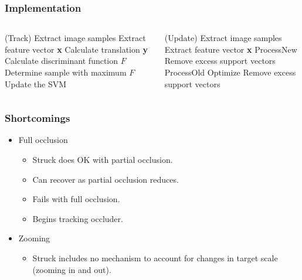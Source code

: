 \begin{frame}
    \frametitle{Implementation}
    \begin{columns}[T]
        \begin{column}{0.5\textwidth}
            \begin{algorithm}[H]
                \DontPrintSemicolon
                \Begin(Track)
                {
                    Extract image samples \;
                    {
                        Extract feature vector \textbf{x} \;
                        Calculate translation \textbf{y} \;
                        Calculate discriminant function \(F\) \;
                    }
                    Determine sample with maximum \(F\) \;
                    Update the SVM \;
                }
            \end{algorithm}
        \end{column}
        \begin{column}{0.5\textwidth}
            \begin{algorithm}[H]
                \DontPrintSemicolon
                \Begin(Update)
                {
                    Extract image samples \;
                    {
                        Extract feature vector \textbf{x} \;
                    }
                    ProcessNew \;
                    Remove excess support vectors \;
                    ProcessOld \;
                    Optimize \;
                    Remove excess support vectors \;
                }
            \end{algorithm}
        \end{column}
    \end{columns}
\end{frame}

\begin{frame}
    \frametitle{Shortcomings}
    \begin{itemize}
        \item Full occlusion
            \begin{itemize}
                \item Struck does OK with partial occlusion.
                \item Can recover as partial occlusion reduces.
                \item Fails with full occlusion.
                \item Begins tracking occluder.
            \end{itemize}
        \item Zooming
            \begin{itemize}
                \item Struck includes no mechanism to account for changes in target scale (zooming
                    in and out).
            \end{itemize}
    \end{itemize}
\end{frame}

